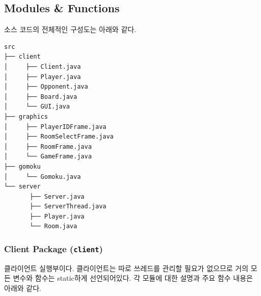 \documentclass[a4paper, 10pt]{article}
\begin{document}
\subsection{Modules \& Functions}
소스 코드의 전체적인 구성도는 아래와 같다.
\begin{Verbatim}[tabsize=4,xleftmargin=2em,baselinestretch=1]
src
├── client
│     ├── Client.java
│     ├── Player.java
│     ├── Opponent.java
│     ├── Board.java
│     └── GUI.java
├── graphics
│     ├── PlayerIDFrame.java
│     ├── RoomSelectFrame.java
│     ├── RoomFrame.java
│     └── GameFrame.java
├── gomoku
│     └── Gomoku.java
└── server
       ├── Server.java
       ├── ServerThread.java
       ├── Player.java
       └── Room.java
\end{Verbatim}

\subsubsection{Client Package (\texttt{client})}
클라이언트 실행부이다. 클라이언트는 따로 쓰레드를 관리할 필요가 없으므로
거의 모든 변수와 함수는 static하게 선언되어있다. 각 모듈에 대한 설명과 주요
함수 내용은 아래와 같다.
\end{document}
